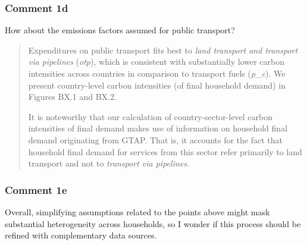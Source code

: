 \documentclass[11pt]{article}
\newenvironment{response}
{\begin{quote}\color{black}}
{\end{quote}}
\begin{document}
\subsubsection*{Comment 1d}\label{comment_R2_1d}

\begin{commentbox}
    How about the emissions factors assumed for public transport?
\end{commentbox}

\begin{response}
    Expenditures on public transport fits best to \textit{land transport and transport via pipelines} (\textit{otp}), which is consistent with substantially lower carbon intensities across countries in comparison to transport fuels (\textit{p\_c}). We present country-level carbon intensities (of final household demand) in Figures BX.1 and BX.2.

    It is noteworthy that our calculation of country-sector-level carbon intensities of final demand makes use of information on household final demand originating from GTAP. That is, it accounts for the fact that household final demand for services from this sector refer primarily to {land transport} and not to \textit{transport via pipelines}.
\end{response}

\subsubsection*{Comment 1e}\label{comment_R2_1e}

\begin{commentbox}
    Overall, simplifying assumptions related to the points above might mask substantial heterogeneity across households, so I wonder if this process should be refined with complementary data sources.
\end{commentbox}
\end{document}
